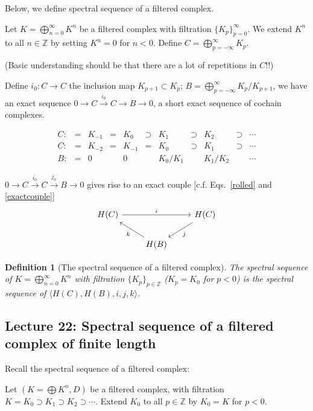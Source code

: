 \documentclass{article}
\theoremstyle{mystyle}
\newtheorem*{definition}{Definition}%
\theoremstyle{remark}
\numberwithin{equation}{section}
\begin{document}
Below, we define spectral sequence of a filtered complex.

Let $K = \bigoplus_{n=0}^\infty K^n$ be a filtered complex with filtration $\{K_p\}_{p=0}^\infty$. We extend $K^n$ to all $n\in \mathbb{Z}$ by setting $K^n=0$ for $n<0$. Define $C = \bigoplus_{p=-\infty}^\infty K_p$.

(Basic understanding should be that there are a lot of repetitions in $C$!!)

Define $i_0\colon C\rightarrow C$ the inclusion map $K_{p+1}\subset K_p$; $B = \bigoplus_{p=-\infty}^\infty K_p/K_{p+1}$, we have an exact sequence $0\rightarrow C\xrightarrow {i_0} C\rightarrow B\rightarrow 0$, a short exact sequence of cochain complexes.

\begin{equation}
\begin{aligned}
C:&=&K_{-1}&=&K_0&\supset& K_1&\supset& K_2&\supset& \cdots\\
C:&=&K_{-2}&=&K_{-1}&=&K_0&\supset& K_1&\supset& \cdots\\
B:&=&  0 && 0 && K_0/K_1 && K_1/K_2 &&\cdots
\end{aligned}
\end{equation}

$0\rightarrow C\xrightarrow {i_0} C\xrightarrow{j_0}B\rightarrow 0$ gives rise to an exact couple [c.f. Eqs.~\eqref{rolled} and \eqref{exactcouple}]
$$
\begin{tikzcd}
H(C)\ar[rr,"i"] &&H(C)\ar[dl,"j"]\\
&H(B)\ar[ul,"k"]&
\end{tikzcd}
$$

\begin{definition}[The spectral sequence of a filtered complex] The spectral sequence of $K = \bigoplus_{n=0}^\infty K^n$ with filtration $\{K_p\}_{p\in \mathbb{Z}}$ ($K_p=K_0$ for $p<0$) is the spectral sequence of $\langle H(C),H(B),i,j,k\rangle$. 
\end{definition}


\subsection{Lecture 22: Spectral sequence of a filtered complex of finite length}

Recall the spectral sequence of a filtered complex:

Let $(K=\bigoplus K^n,D)$ be a filtered complex, with filtration $K = K_0\supset K_1\supset K_2 \supset \cdots$. Extend $K_0$ to all $p\in \mathbb{Z}$ by $K_0 = K$ for $p<0$.
\end{document}
